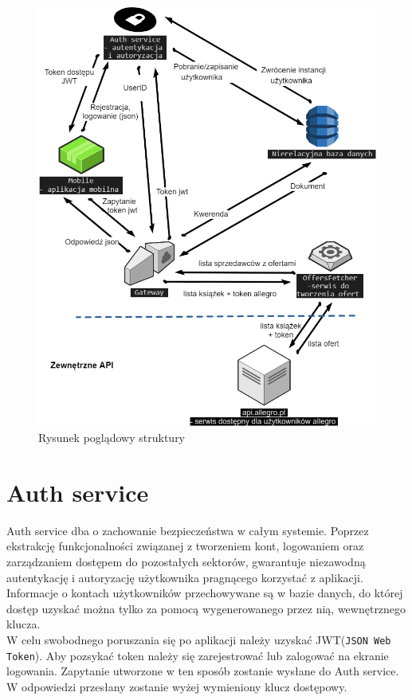 \begin{figure}[H]
	\centering
	\includegraphics[width=\linewidth]{architecture_overview.png}
	\caption{Rysunek poglądowy struktury}
\end{figure}

\section{Auth service}
Auth service dba o zachowanie bezpieczeństwa w całym systemie.
Poprzez ekstrakcję funkcjonalności związanej z tworzeniem kont, logowaniem oraz zarządzaniem dostępem do pozostałych sektorów, gwarantuje niezawodną autentykację i autoryzację użytkownika pragnącego korzystać z aplikacji.\\
Informacje o kontach użytkowników przechowywane są w bazie danych, do której dostęp uzyskać można tylko za pomocą wygenerowanego przez nią, wewnętrznego klucza. 
\\
W celu swobodnego poruszania się po aplikacji należy uzyskać JWT(\texttt{JSON Web Token}). Aby pozsykać token należy się zarejestrować lub zalogować na ekranie logowania. Zapytanie utworzone w ten sposób zostanie wysłane do Auth service. W odpowiedzi przesłany zostanie wyżej wymieniony klucz dostępowy.\\

